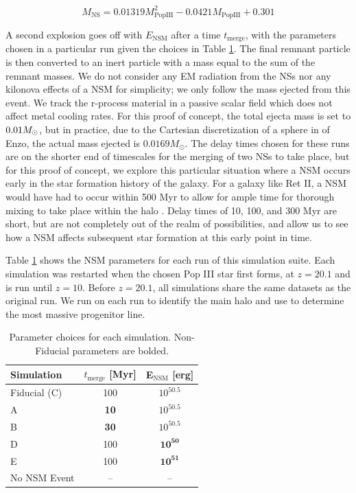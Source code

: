 \documentclass[fleqn,usenatbib]{mnras}
\begin{document}
\begin{equation} \label{eq:nsm_mass}
	M_{\mathrm{NS}} = 0.01319 M_{\mathrm{PopIII}}^{2} - 0.0421 M_{\mathrm{PopIII}} + 0.301
\end{equation}

A second explosion goes off with $E_{\textrm{NSM}}$ after a time $t_{\textrm{merge}}$, with the parameters chosen in a particular run given the choices in Table \ref{tab:NSM_params}. The final remnant particle is then converted to an inert particle with a mass equal to the sum of the remnant masses. We do not consider any EM radiation from the NSs nor any kilonova effects of a NSM for simplicity; we only follow the mass ejected from this event. We track the r-process material in a passive scalar field which does not affect metal cooling rates. For this proof of concept, the total ejecta mass is set to $0.01 \Ms$, but in practice, due to the Cartesian discretization of a sphere in of Enzo, the actual mass ejected is $0.0169 M_{\odot}$. The delay times chosen for these runs are on the shorter end of timescales for the merging of two NSs to take place, but for this proof of concept, we explore this particular situation where a NSM occurs early in the star formation history of the galaxy. For a galaxy like Ret II, a NSM would have had to occur within 500 Myr to allow for ample time for thorough mixing to take place within the halo \citep{Simon23}. Delay times of 10, 100, and 300 Myr are short, but are not completely out of the realm of possibilities, and allow us to see how a NSM affects subsequent star formation at this early point in time. 

Table \ref{tab:NSM_params} shows the NSM parameters for each run of this simulation suite. Each simulation was restarted when the chosen Pop III star first forms, at $z = 20.1$ and is run until $z = 10$. Before $z = 20.1$, all simulations share the same datasets as the original run. We run \rockstar{} \citep{rockstar} on each run to identify the main halo and use \ytree{} \citep{ytree} to determine the most massive progenitor line.

\begin{table}
	\centering
	\begin{tabular}{lcc} 
		\hline
		Simulation & $t_{\textrm{merge}}$ [Myr] & E$_{\textrm{NSM}}$ [erg] \\
		\hline
		Fiducial (C) & 100 & $10^{50.5}$ \\
		A & \textbf{10} & $10^{50.5}$ \\
		B & \textbf{30} & $10^{50.5}$ \\
		D & 100 & $\mathbf{10^{50}}$ \\
		E & 100 & $\mathbf{10^{51}}$ \\
		No NSM Event & -- & -- \\
		\hline
	\end{tabular}
	\caption{Parameter choices for each simulation. Non-Fiducial parameters are bolded.}
	\label{tab:NSM_params}
\end{table}
\end{document}
